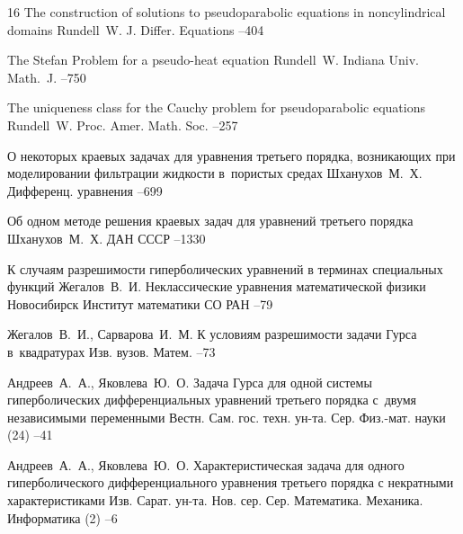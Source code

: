 \begin{thebibliography}{16}
\paper The construction of solutions to pseudoparabolic equations in noncylindrical domains
\by Rundell~W.
\jour J. Differ. Equations
--404

\paper The Stefan Problem for a pseudo-heat equation
\by Rundell~W.
\jour Indiana Univ. Math.~J.
--750

\paper The uniqueness class for the Cauchy problem for pseudoparabolic equations
\by Rundell~W.
\jour Proc. Amer. Math. Soc.
--257

\paper О некоторых краевых задачах для уравнения третьего порядка, возникающих при моделировании фильтрации жидкости в~пористых средах
\by Шханухов~М.~Х.
\jour Дифференц. уравнения
--699

\paper Об одном методе решения краевых задач для уравнений третьего порядка
\by Шханухов~М.~Х.
\jour ДАН СССР
--1330




\paper К случаям разрешимости гиперболических уравнений в терминах специальных функций
\by Жегалов~В.~И.
\inbook Неклассические уравнения математической физики
\publaddr Новосибирск
\publ Институт математики СО РАН
--79



\by Жегалов~В.~И., Сарварова~И.~М.
\paper К условиям разрешимости задачи Гурса в~квадратурах
\jour Изв. вузов. Матем.
--73

\by Андреев~А.~А., Яковлева~Ю.~О.
\paper Задача Гурса для одной системы гиперболических дифференциальных уравнений третьего порядка с~двумя независимыми переменными
\jour Вестн. Сам. гос. техн. ун-та. Сер. Физ.-мат. науки
(24)
--41

\by Андреев~А.~А., Яковлева~Ю.~О.
\paper Характеристическая задача для одного гиперболического дифференциального уравнения третьего порядка с некратными характеристиками
\jour Изв. Сарат. ун-та. Нов. сер. Сер. Математика. Механика. Информатика
(2)
--6

\end{thebibliography}


